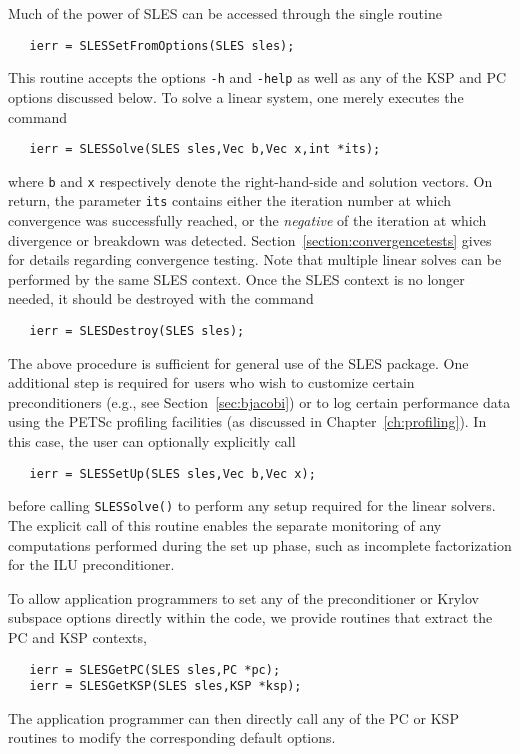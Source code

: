 Much of the power of SLES can be accessed through the single routine
\begin{verbatim}
   ierr = SLESSetFromOptions(SLES sles);
\end{verbatim}
This 
routine accepts the options {\tt -h} and {\tt -help} as well as 
any of the KSP and PC options discussed below. 
To solve a linear system, one merely executes the command 
\begin{verbatim}
   ierr = SLESSolve(SLES sles,Vec b,Vec x,int *its);
\end{verbatim}
where {\tt b} and {\tt x} respectively denote the right-hand-side and
solution vectors.  On return, the parameter {\tt its} contains
either the iteration number at which convergence was successfully
reached, or the {\em negative} of the iteration at which divergence or
breakdown was detected.  Section~\ref{section:convergencetests} gives
for details regarding convergence testing.
Note that multiple linear solves can be performed by the same SLES context.
Once the SLES context is no longer needed, it should be destroyed with the 
command 
\begin{verbatim}
   ierr = SLESDestroy(SLES sles);
\end{verbatim}

The above procedure is sufficient for general use of the SLES package.
One additional step is required for users who wish to customize certain 
preconditioners (e.g., see Section~\ref{sec:bjacobi}) or to log certain 
performance data using the PETSc profiling facilities (as discussed in 
Chapter~\ref{ch:profiling}).
In this case, the user can optionally explicitly call 
\begin{verbatim}
   ierr = SLESSetUp(SLES sles,Vec b,Vec x);
\end{verbatim}
before calling {\tt SLESSolve()} to perform any setup required for 
the linear solvers.  The explicit call of this routine enables the
separate monitoring of any computations performed during the set up
phase, such as incomplete factorization for the ILU preconditioner.

To allow application programmers to set any of the preconditioner or 
Krylov subspace options directly within the code, we provide routines
that extract the PC and KSP contexts, 
\begin{verbatim}
   ierr = SLESGetPC(SLES sles,PC *pc);
   ierr = SLESGetKSP(SLES sles,KSP *ksp);
\end{verbatim}
The application programmer can then directly call any of the PC or KSP 
routines to modify the corresponding default options. 

